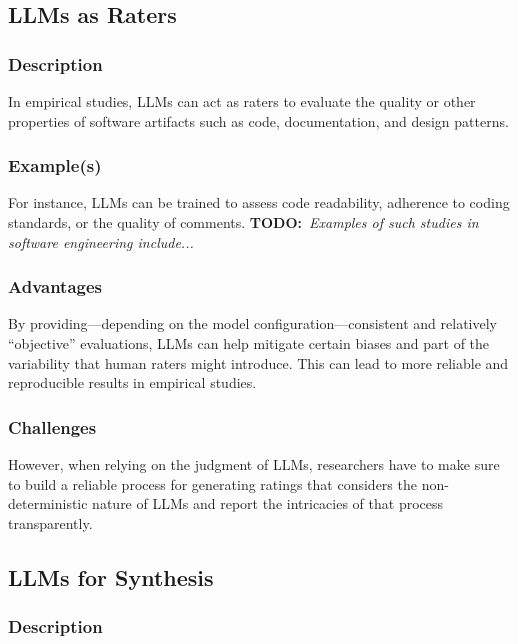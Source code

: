 \documentclass[11pt]{article}
\newcommand{\todo}[1]{{\textbf{TODO:}\ \textit{#1}}} %
\begin{document}
\subsection{LLMs as Raters}

\subsubsection{Description}

In empirical studies, LLMs can act as raters to evaluate the quality or other properties of software artifacts such as code, documentation, and design patterns.

\subsubsection{Example(s)}

For instance, LLMs can be trained to assess code readability, adherence to coding standards, or the quality of comments. \todo{Examples of such studies in software engineering include...}

\subsubsection{Advantages}

By providing---depending on the model configuration---consistent and relatively ``objective'' evaluations, LLMs can help mitigate certain biases and part of the variability that human raters might introduce. 
This can lead to more reliable and reproducible results in empirical studies.

\subsubsection{Challenges}

However, when relying on the judgment of LLMs, researchers have to make sure to build a reliable process for generating ratings that considers the non-deterministic nature of LLMs and report the intricacies of that process transparently.


\subsection{LLMs for Synthesis}

\subsubsection{Description}
\end{document}
